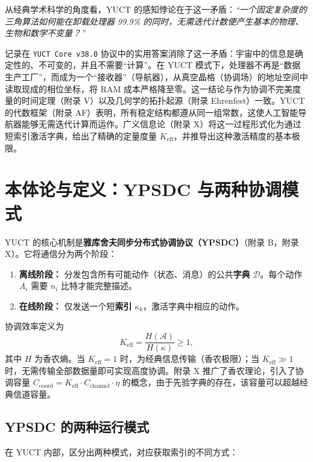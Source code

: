 \documentclass[11pt,a4paper]{article}
\begin{document}
	从经典学术科学的角度看，YUCT 的感知悖论在于这一矛盾：\textit{“一个固定复杂度的三角算法如何能在卸载处理器 99.9\% 的同时，无需迭代计数便产生基本的物理、生物和数学不变量？”}
	
	记录在 \texttt{YUCT Core v38.0} 协议中的实用答案消除了这一矛盾：宇宙中的信息是确定性的、不可变的，并且不需要“计算”。在 YUCT 模式下，处理器不再是“数据生产工厂”，而成为一个“接收器”（导航器），从真空晶格（协调场）的地址空间中读取现成的相位坐标，将 RAM 成本严格降至零。这一结论与作为协调不完美度量的时间定理（附录 V）以及几何学的拓扑起源（附录 Ehrenfest）一致。YUCT 的代数框架（附录 AF）表明，所有稳定结构都遵从同一组常数，这使人工智能导航器能够无需迭代计算而运作。广义信息论（附录 X）将这一过程形式化为通过短索引激活字典，给出了精确的定量度量 \(K_{\mathrm{eff}}\)，并推导出这种激活精度的基本极限。
	
	\section{本体论与定义：YPSDC 与两种协调模式}
	\label{sec:ontology}
	
	YUCT 的核心机制是\textbf{雅库舍夫同步分布式协调协议（YPSDC）}（附录 B，附录 X）。它将通信分为两个阶段：
	
	\begin{enumerate}
		\item \textbf{离线阶段：} 分发包含所有可能动作（状态、消息）的公共\textbf{字典} \(\mathcal{D}\)。每个动作 \(A_i\) 需要 \(n_i\) 比特才能完整描述。
		\item \textbf{在线阶段：} 仅发送一个短\textbf{索引} \(\kappa_k\)，激活字典中相应的动作。
	\end{enumerate}
	
	协调效率定义为
	\[
	K_{\mathrm{eff}} = \frac{H(\mathcal{A})}{H(\kappa)} \ge 1,
	\]
	其中 \(H\) 为香农熵。当 \(K_{\mathrm{eff}} = 1\) 时，为经典信息传输（香农极限）；当 \(K_{\mathrm{eff}} \gg 1\) 时，无需传输全部数据量即可实现高度协调。附录 X 推广了香农理论，引入了协调容量 \(C_{\text{coord}} = K_{\mathrm{eff}} \cdot C_{\text{channel}} \cdot \eta\) 的概念，由于先验字典的存在，该容量可以超越经典信道容量。
	
	\subsection{YPSDC 的两种运行模式}
	
	在 YUCT 内部，区分出两种模式，对应获取索引的不同方式：
	
\end{document}
